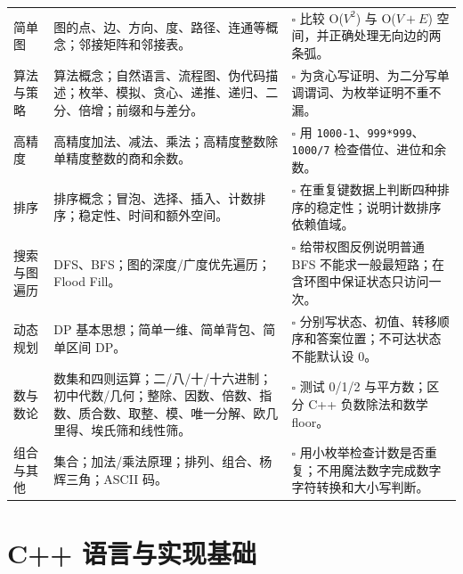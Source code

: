 \documentclass[a4paper,11pt]{article}
\newcommand{\code}[1]{\texttt{#1}}
\begin{document}
\begin{longtable}{L{2.5cm} L{8.6cm} L{5.5cm}}
简单图
& 图的点、边、方向、度、路径、连通等概念；邻接矩阵和邻接表。
& $\square$ 比较 O($V^2$) 与 O($V+E$) 空间，并正确处理无向边的两条弧。 \\[2mm]

算法与策略
& 算法概念；自然语言、流程图、伪代码描述；枚举、模拟、贪心、递推、递归、二分、倍增；前缀和与差分。
& $\square$ 为贪心写证明、为二分写单调谓词、为枚举证明不重不漏。 \\[2mm]

高精度
& 高精度加法、减法、乘法；高精度整数除单精度整数的商和余数。
& $\square$ 用 \code{1000-1}、\code{999*999}、\code{1000/7} 检查借位、进位和余数。 \\[2mm]

排序
& 排序概念；冒泡、选择、插入、计数排序；稳定性、时间和额外空间。
& $\square$ 在重复键数据上判断四种排序的稳定性；说明计数排序依赖值域。 \\[2mm]

搜索与图遍历
& DFS、BFS；图的深度/广度优先遍历；Flood Fill。
& $\square$ 给带权图反例说明普通 BFS 不能求一般最短路；在含环图中保证状态只访问一次。 \\[2mm]

动态规划
& DP 基本思想；简单一维、简单背包、简单区间 DP。
& $\square$ 分别写状态、初值、转移顺序和答案位置；不可达状态不能默认设 0。 \\[2mm]

数与数论
& 数集和四则运算；二/八/十/十六进制；初中代数/几何；整除、因数、倍数、指数、质合数、取整、模、唯一分解、欧几里得、埃氏筛和线性筛。
& $\square$ 测试 0/1/2 与平方数；区分 C++ 负数除法和数学 floor。 \\[2mm]

组合与其他
& 集合；加法/乘法原理；排列、组合、杨辉三角；ASCII 码。
& $\square$ 用小枚举检查计数是否重复；不用魔法数字完成数字字符转换和大小写判断。 \\
\end{longtable}
\endgroup

\newpage

\section{C++ 语言与实现基础}
\end{document}
